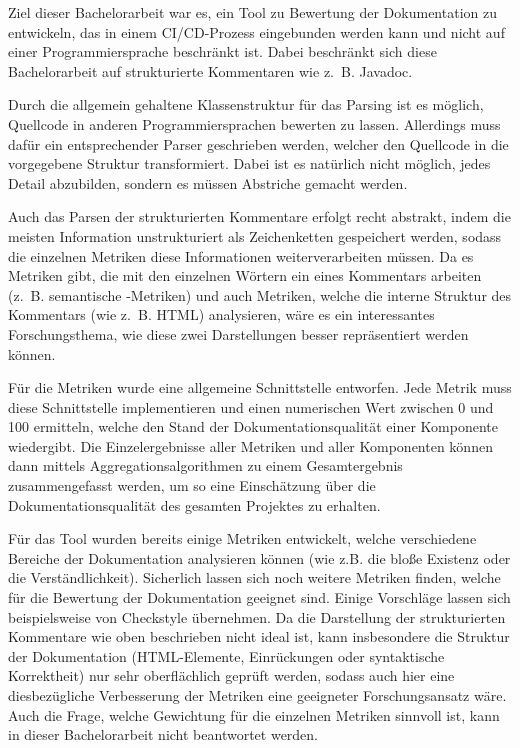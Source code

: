 Ziel dieser Bachelorarbeit war es, ein Tool zu Bewertung der Dokumentation zu entwickeln, das in einem \ac{CI/CD}-Prozess eingebunden werden kann und nicht auf einer Programmiersprache beschränkt ist. Dabei beschränkt sich diese Bachelorarbeit auf strukturierte Kommentaren wie z.~B. Javadoc. 

Durch die allgemein gehaltene Klassenstruktur für das Parsing ist es möglich, Quellcode in anderen Programmiersprachen bewerten zu lassen. Allerdings muss dafür ein entsprechender Parser geschrieben werden, welcher den Quellcode in die vorgegebene Struktur transformiert. Dabei ist es natürlich nicht möglich, jedes Detail abzubilden, sondern es müssen Abstriche gemacht werden. 

Auch das Parsen der strukturierten Kommentare erfolgt recht abstrakt, indem  die meisten Information unstrukturiert als Zeichenketten gespeichert werden, sodass die einzelnen Metriken diese Informationen weiterverarbeiten müssen. Da es Metriken gibt, die mit den einzelnen Wörtern ein eines Kommentars arbeiten (z.~B. semantische -Metriken) und auch Metriken, welche die interne Struktur des Kommentars (wie z.~B. \ac{HTML}) analysieren, wäre es ein interessantes Forschungsthema, wie diese zwei Darstellungen besser repräsentiert werden können. 


Für die Metriken wurde eine allgemeine Schnittstelle entworfen. Jede Metrik muss diese Schnittstelle implementieren und einen numerischen Wert  zwischen 0 und 100 ermitteln, welche den Stand der Dokumentationsqualität einer Komponente wiedergibt. Die Einzelergebnisse aller Metriken und aller Komponenten können dann mittels Aggregationsalgorithmen zu einem Gesamtergebnis zusammengefasst werden, um so eine Einschätzung über die Dokumentationsqualität des gesamten Projektes zu erhalten. 

Für das Tool wurden bereits einige Metriken entwickelt, welche verschiedene Bereiche der Dokumentation analysieren können (wie z.B. die bloße Existenz oder die Verständlichkeit). Sicherlich lassen sich noch weitere Metriken finden, welche für die Bewertung der Dokumentation geeignet sind. Einige Vorschläge lassen sich beispielsweise von Checkstyle \cite{checkstyle_doc_metrics} übernehmen. Da die Darstellung der strukturierten Kommentare wie oben beschrieben nicht ideal ist, kann insbesondere die Struktur der Dokumentation (HTML-Elemente, Einrückungen oder syntaktische Korrektheit) nur sehr oberflächlich geprüft werden, sodass auch hier eine diesbezügliche Verbesserung der Metriken eine geeigneter Forschungsansatz wäre. Auch die Frage, welche Gewichtung für die einzelnen Metriken sinnvoll ist, kann in dieser Bachelorarbeit nicht beantwortet werden. 

